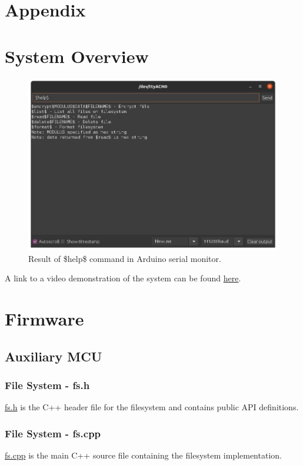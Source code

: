 \section{Appendix}
\appendix

\section{System Overview}
\label{sec:SystemOverview}
\begin{figure}[H]
\centering
\includegraphics[width=1\columnwidth]{Figures/Fig_80.png}
\caption{Result of \$help\$ command in Arduino serial monitor.}
\label{fig:gantt}
\end{figure}

A link to a video demonstration of the system can be found \href{https://www.youtube.com/watch?v=u4TFHCfZJ7M}{here}. 

\section{Firmware}
\subsection{Auxiliary MCU}
\subsubsection{File System - fs.h}
\label{sec:fsh}
\href{https://github.com/spacehen/EEE4022F/blob/main/Firmware/Auxiliary\%20MCU/fs.h}{fs.h} is the C++ header file for the filesystem and contains public API definitions. 
\subsubsection{File System - fs.cpp}
\label{sec:fscpp}
\href{https://github.com/spacehen/EEE4022F/blob/main/Firmware/Auxiliary\%20MCU/fs.cpp}{fs.cpp} is the main C++ source file containing the filesystem implementation.

